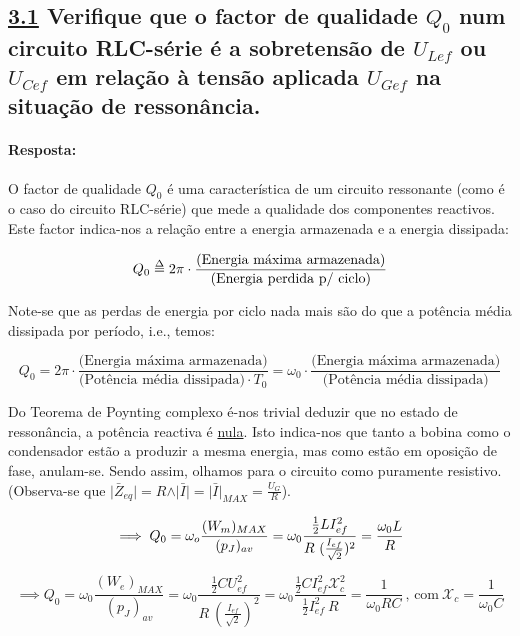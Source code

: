 \def\delequal{\mathrel{\ensurestackMath{\stackon[1pt]{=}{\scriptstyle\Delta}}}}
\subsection*{\underline{3.1} Verifique que o factor de qualidade $Q_0$ num circuito RLC-série é a sobretensão de $U_{Lef}$ ou $U_{Cef}$ em relação à tensão aplicada $U_{Gef}$ na situação de ressonância.}
\label{subsection3_1}
\paragraph{Resposta:}
O factor de qualidade $Q_0$  é uma característica de um circuito ressonante (como é o caso do circuito RLC-série) que mede a qualidade dos componentes reactivos. Este factor indica-nos a relação entre a energia armazenada e a energia dissipada:

$$ Q_0 \delequal 2\pi \cdot \frac{\text{(Energia máxima armazenada)}}{\text{(Energia perdida p/ ciclo)}} $$

Note-se que as perdas de energia por ciclo nada mais são do que a potência média dissipada por período, i.e., temos:

$$ Q_0 = 2\pi \cdot \frac{\text{(Energia máxima armazenada)}}{\text{(Potência média dissipada)}\cdot T_0} = \omega_0 \cdot \frac{\text{(Energia máxima armazenada)}}{\text{(Potência média dissipada)}}$$

Do Teorema de Poynting complexo é-nos trivial deduzir que no estado de ressonância, a potência reactiva é \underline{nula}. Isto indica-nos que tanto a bobina como o condensador estão a produzir a mesma energia, mas como estão em oposição de fase, anulam-se. Sendo assim, olhamos para o circuito como puramente resistivo. (Observa-se que $\vert \bar{Z}_{eq}\vert = R \land \vert \bar{I}\vert = \vert\bar{I}\vert_{MAX} = \frac{U_{G}}{R}$).

$$ 
\implies Q_0 = \omega_o \frac{(W_m)_{MAX}}{(p_J)_{av}} = \omega_0 \frac{\frac{1}{2}LI_{ef}^2}{R\ (\frac{I_{ef}}{\sqrt{2}})^2} = \frac{\omega_0 L}{R}\\ 
$$

$$
\implies Q_0 = \omega_0 \frac{(W_e)_{MAX}}{(p_J)_{av}} = \omega_0 \frac{\frac{1}{2}C U_{ef}^2}{R\ (\frac{I_{ef}}{\sqrt{2}})^2} = \omega_0 \frac{\frac{1}{2} C I_{ef}^2 \mathcal{X}_c^2}{\frac{1}{2}I_{ef}^2\ R} = \frac{1}{\omega_0 RC}\ \text{, com}\ \mathcal{X}_c = \frac{1}{\omega_0 C}
$$

